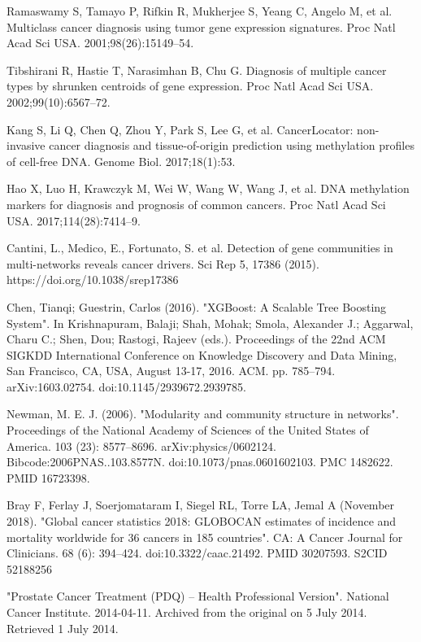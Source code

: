 \documentclass[12pt,a4paper]{report}
\begin{document}
\begin{thebibliography}{HHM99}
Ramaswamy S, Tamayo P, Rifkin R, Mukherjee S, Yeang C, Angelo M, et al. Multiclass cancer diagnosis using tumor gene expression signatures. Proc Natl Acad Sci USA. 2001;98(26):15149–54.


Tibshirani R, Hastie T, Narasimhan B, Chu G. Diagnosis of multiple cancer types by shrunken centroids of gene expression. Proc Natl Acad Sci USA. 2002;99(10):6567–72.

Kang S, Li Q, Chen Q, Zhou Y, Park S, Lee G, et al. CancerLocator: non-invasive cancer diagnosis and tissue-of-origin prediction using methylation profiles of cell-free DNA. Genome Biol. 2017;18(1):53.


Hao X, Luo H, Krawczyk M, Wei W, Wang W, Wang J, et al. DNA methylation markers for diagnosis and prognosis of common cancers. Proc Natl Acad Sci USA. 2017;114(28):7414–9.

Cantini, L., Medico, E., Fortunato, S. et al. Detection of gene communities in multi-networks reveals cancer drivers. Sci Rep 5, 17386 (2015). https://doi.org/10.1038/srep17386

Chen, Tianqi; Guestrin, Carlos (2016). "XGBoost: A Scalable Tree Boosting System". In Krishnapuram, Balaji; Shah, Mohak; Smola, Alexander J.; Aggarwal, Charu C.; Shen, Dou; Rastogi, Rajeev (eds.). Proceedings of the 22nd ACM SIGKDD International Conference on Knowledge Discovery and Data Mining, San Francisco, CA, USA, August 13-17, 2016. ACM. pp. 785–794. arXiv:1603.02754. doi:10.1145/2939672.2939785.

Newman, M. E. J. (2006). "Modularity and community structure in networks". Proceedings of the National Academy of Sciences of the United States of America. 103 (23): 8577–8696. arXiv:physics/0602124. Bibcode:2006PNAS..103.8577N. doi:10.1073/pnas.0601602103. PMC 1482622. PMID 16723398.


Bray F, Ferlay J, Soerjomataram I, Siegel RL, Torre LA, Jemal A (November 2018). "Global cancer statistics 2018: GLOBOCAN estimates of incidence and mortality worldwide for 36 cancers in 185 countries". CA: A Cancer Journal for Clinicians. 68 (6): 394–424. doi:10.3322/caac.21492. PMID 30207593. S2CID 52188256

"Prostate Cancer Treatment (PDQ) – Health Professional Version". National Cancer Institute. 2014-04-11. Archived from the original on 5 July 2014. Retrieved 1 July 2014.


\end{thebibliography}
\end{document}
